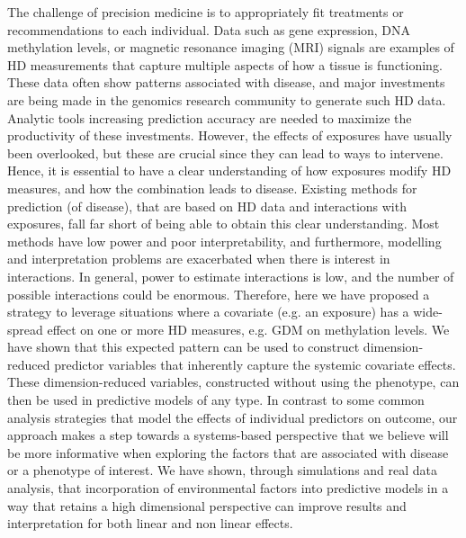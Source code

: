 The challenge of precision medicine is to appropriately fit treatments or recommendations to each individual.  Data such as gene expression, DNA methylation levels, or magnetic resonance imaging (MRI) signals are examples of HD measurements that capture multiple aspects of how a tissue is functioning. These data often show patterns associated with disease, and major investments are being made in the genomics research community to generate such HD data. Analytic tools increasing prediction accuracy are needed to maximize the productivity of these investments. However, the effects of exposures have usually been overlooked, but these are crucial since they can lead to ways to intervene. %
Hence, it is essential to have a clear understanding of how exposures modify HD measures, and how the combination leads to disease. Existing methods for prediction (of disease), that are based on HD data and interactions with exposures, fall far short of being able to obtain this clear understanding. Most methods have low power and poor interpretability, and furthermore, modelling and interpretation problems are exacerbated when there is interest in interactions. In general, power to estimate interactions is low, and the number of possible interactions could be enormous. Therefore, here we have proposed a strategy to leverage situations where a covariate (e.g. an exposure) has a wide-spread effect on one or more HD measures, e.g. GDM on methylation levels. We have shown that this expected pattern can be used to construct dimension-reduced predictor variables that inherently capture the systemic covariate effects. These dimension-reduced variables, constructed without using the phenotype, can then be used in predictive models of any type.   In contrast to some common analysis strategies that model the effects of individual predictors on outcome, our approach makes a step towards a systems-based perspective that we believe will be more informative when exploring the factors that are associated with disease or a phenotype of interest. We have shown, through simulations and real data analysis, that incorporation of environmental factors into predictive models in a way that retains a high dimensional perspective can improve results and interpretation for both linear and non linear effects.

